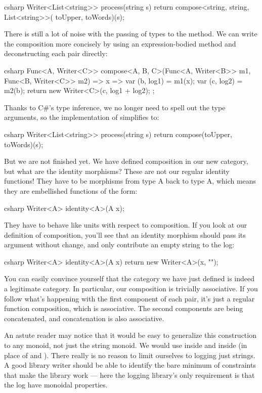 \begin{snip}{csharp}
Writer<List<string>> process(string s) {
    return compose<string, string, List<string>>(
        toUpper, toWords)(s);
}
\end{snip}
There is still a lot of noise with the passing of types to the
 method. We can write the composition more concisely by
using an expression-bodied method and deconstructing each 
pair directly:

\begin{snip}{csharp}
Func<A, Writer<C>> compose<A, B, C>(Func<A, Writer<B>> m1,
                                    Func<B, Writer<C>> m2) =>
    x => {
        var (b, log1) = m1(x);
        var (c, log2) = m2(b);
        return new Writer<C>(c, log1 + log2);
    };
\end{snip}
Thanks to C\#'s type inference, we no longer need to spell out the type
arguments, so the implementation of  simplifies to:

\begin{snip}{csharp}
Writer<List<string>> process(string s) {
    return compose(toUpper, toWords)(s);
}
\end{snip}
But we are not finished yet. We have defined composition in our new
category, but what are the identity morphisms? These are not our regular
identity functions! They have to be morphisms from type A back to type
A, which means they are embellished functions of the form:

\begin{snip}{csharp}
Writer<A> identity<A>(A x);
\end{snip}
They have to behave like units with respect to composition. If you look
at our definition of composition, you'll see that an identity morphism
should pass its argument without change, and only contribute an empty
string to the log:

\begin{snip}{csharp}
Writer<A> identity<A>(A x) {
    return new Writer<A>(x, "");
}
\end{snip}
You can easily convince yourself that the category we have just defined
is indeed a legitimate category. In particular, our composition is
trivially associative. If you follow what's happening with the first
component of each pair, it's just a regular function composition, which
is associative. The second components are being concatenated, and
concatenation is also associative.

An astute reader may notice that it would be easy to generalize this
construction to any monoid, not just the string monoid. We would use
 inside  and  inside
 (in place of \code{+} and ). There really
is no reason to limit ourselves to logging just strings. A good library
writer should be able to identify the bare minimum of constraints that
make the library work --- here the logging library's only requirement is
that the log have monoidal properties.

